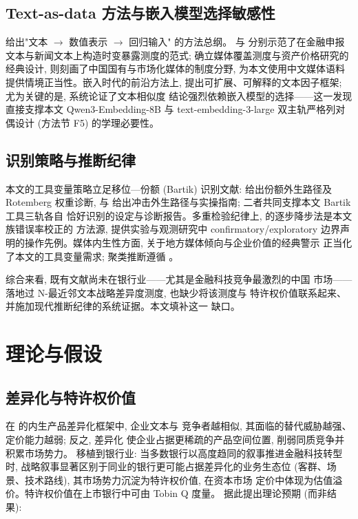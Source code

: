 \subsection{Text-as-data 方法与嵌入模型选择敏感性}
\textcite{gentzkow2019text} 给出"文本 $\to$ 数值表示 $\to$ 回归输入"
的方法总纲。\textcite{hanley2019dynamic} 与 \textcite{engle2020climatenews}
分别示范了在金融申报文本与新闻文本上构造时变暴露测度的范式;
\textcite{fang2009media} 确立媒体覆盖测度与资产价格研究的经典设计,
\textcite{you2018pen} 则刻画了中国国有与市场化媒体的制度分野,
为本文使用中文媒体语料提供情境正当性。嵌入时代的前沿方法上,
\textcite{cong2024textualfactors} 提出可扩展、可解释的文本因子框架;
尤为关键的是, \textcite{ganguli2024patenttext} 系统论证了文本相似度
结论强烈依赖嵌入模型的选择——这一发现直接支撑本文
Qwen3-Embedding-8B 与 text-embedding-3-large 双主轨严格列对偶设计
(方法节 F5) 的学理必要性。

\subsection{识别策略与推断纪律}
本文的工具变量策略立足移位—份额 (Bartik) 识别文献:
\textcite{goldsmith2020bartik} 给出份额外生路径及 Rotemberg 权重诊断,
\textcite{borusyak2022shiftshare} 与 \textcite{borusyak2025shiftshareguide}
给出冲击外生路径与实操指南; 二者共同支撑本文 Bartik 工具三轨各自
恰好识别的设定与诊断报告。多重检验纪律上,
\textcite{romano2005stepwise} 的逐步降步法是本文族错误率校正的
方法源, \textcite{list2019multiplehypothesis} 提供实验与观测研究中
confirmatory/exploratory 边界声明的操作先例。媒体内生性方面,
\textcite{gurun2012hype} 关于地方媒体倾向与企业价值的经典警示
正当化了本文的工具变量需求; 聚类推断遵循
\textcite{cameron2015practitioner}。

综合来看, 既有文献尚未在银行业——尤其是金融科技竞争最激烈的中国
市场——落地过 N-最近邻文本战略差异度测度, 也缺少将该测度与
特许权价值联系起来、并施加现代推断纪律的系统证据。本文填补这一
缺口。

\section{理论与假设}\label{sec:theory}

\subsection{差异化与特许权价值}
在 \textcite{hoberg2016tnic} 的内生产品差异化框架中, 企业文本与
竞争者越相似, 其面临的替代威胁越强、定价能力越弱; 反之, 差异化
使企业占据更稀疏的产品空间位置, 削弱同质竞争并积累市场势力。
移植到银行业: 当多数银行以高度趋同的叙事推进金融科技转型时,
战略叙事显著区别于同业的银行更可能占据差异化的业务生态位
(客群、场景、技术路线), 其市场势力沉淀为特许权价值, 在资本市场
定价中体现为估值溢价。特许权价值在上市银行中可由 Tobin Q 度量。
据此提出理论预期 (而非结果):

